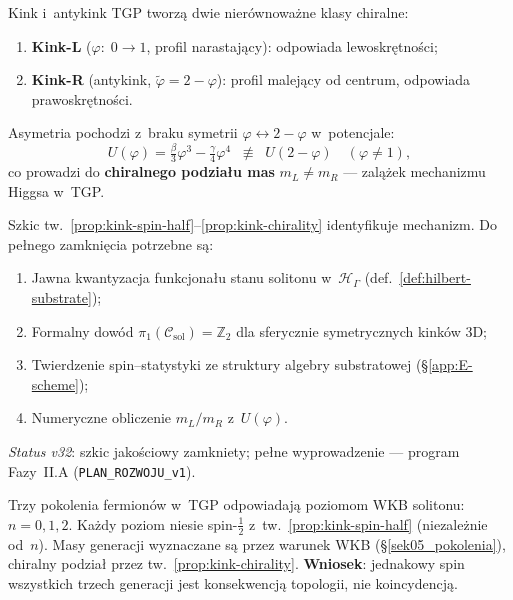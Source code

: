 \begin{proposition}%
\label{prop:kink-chirality}
Kink i~antykink TGP tworz\k{a} dwie nierównoważne klasy
chiralne:
\begin{enumerate}[(C1)]
  \item \textbf{Kink-L} ($\varphi{:}\;0\!\to\!1$, profil narastaj\k{a}cy):
    odpowiada lewoskr\k{e}tno\'sci;
  \item \textbf{Kink-R} (antykink, $\tilde\varphi = 2-\varphi$):
    profil malej\k{a}cy od centrum,
    odpowiada prawoskr\k{e}tno\'sci.
\end{enumerate}
Asymetria pochodzi z~braku symetrii $\varphi \leftrightarrow 2-\varphi$
w~potencjale:
\begin{equation}\label{eq:chirality-asymmetry}
  U(\varphi) = \tfrac{\beta}{3}\varphi^3 - \tfrac{\gamma}{4}\varphi^4
  \;\;\not\equiv\;\;
  U(2-\varphi)
  \quad (\varphi \neq 1),
\end{equation}
co prowadzi do \textbf{chiralnego podzia\l{}u mas}
$m_L \neq m_R$ --- zal\k{a}\.zek mechanizmu Higgsa w~TGP.
\end{proposition}

\begin{problem}%
\label{prob:fermion-full}
Szkic tw.~\ref{prop:kink-spin-half}--\ref{prop:kink-chirality}
identyfikuje mechanizm.
Do pe\l{}nego zamkni\k{e}cia potrzebne s\k{a}:
\begin{enumerate}[nosep]
  \item Jawna kwantyzacja funkcjona\l{}u stanu solitonu
    w~$\mathcal{H}_\Gamma$ (def.~\ref{def:hilbert-substrate});
  \item Formalny dow\'od $\pi_1(\mathcal{C}_{\mathrm{sol}}) = \mathbb{Z}_2$
    dla sferycznie symetrycznych kink\'ow 3D;
  \item Twierdzenie spin--statystyki ze struktury
    algebry substratowej (\S\ref{app:E-scheme});
  \item Numeryczne obliczenie $m_L/m_R$ z~$U(\varphi)$.
\end{enumerate}
\textit{Status v32}: szkic jako\'sciowy zamkniety;
pe\l{}ne wyprowadzenie --- program Fazy~II.A
(\texttt{PLAN\_ROZWOJU\_v1}).
\end{problem}

\begin{remark}%
\label{rem:generations-wkb}
Trzy pokolenia fermion\'ow w~TGP odpowiadaj\k{a}
poziomom WKB solitonu: $n = 0, 1, 2$.
Ka\.zdy poziom niesie spin-$\tfrac{1}{2}$
z~tw.~\ref{prop:kink-spin-half} (niezale\.znie od~$n$).
Masy generacji wyznaczane s\k{a} przez warunek WKB
(\S\ref{sek05_pokolenia}), chiralny podzia\l{}
przez tw.~\ref{prop:kink-chirality}.
\textbf{Wniosek}: jednakowy spin wszystkich trzech generacji
jest konsekwencj\k{a} topologii, nie koincydencj\k{a}.
\end{remark}
